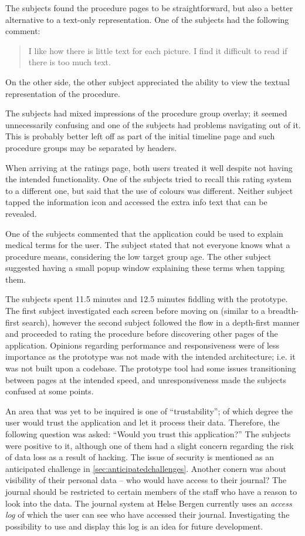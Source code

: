 The subjects found the procedure pages to be straightforward, but also a better alternative to a text-only representation. One of the subjects had the following comment:

\begin{quote}
    I like how there is little text for each picture. I find it difficult to read if there is too much text.
\end{quote}

On the other side, the other subject appreciated the ability to view the textual representation of the procedure.

The subjects had mixed impressions of the procedure group overlay; it seemed unnecessarily confusing and one of the subjects had problems navigating out of it. This is probably better left off as part of the initial timeline page and such procedure groups may be separated by headers.

When arriving at the ratings page, both users treated it well despite not having the intended functionality. One of the subjects tried to recall this rating system to a different one, but said that the use of colours was different. Neither subject tapped the information icon and accessed the extra info text that can be revealed.

One of the subjects commented that the application could be used to explain medical terms for the user. The subject stated that not everyone knows what a procedure means, considering the low target group age. The other subject suggested having a small popup window explaining these terms when tapping them.

The subjects spent 11.5 minutes and 12.5 minutes fiddling with the prototype. The first subject investigated each screen before moving on (similar to a breadth-first search), however the second subject followed the flow in a depth-first manner and proceeded to rating the procedure before discovering other pages of the application. Opinions regarding performance and responsiveness were of less importance as the prototype was not made with the intended architecture; i.e. it was not built upon a codebase. The prototype tool had some issues transitioning between pages at the intended speed, and unresponsiveness made the subjects confused at some points.

An area that was yet to be inquired is one of \enquote{trustability}; of which degree the user would trust the application and let it process their data. Therefore, the following question was asked: \enquote{Would you trust this application?} The subjects were positive to it, although one of them had a slight concern regarding the risk of data loss as a result of hacking. The issue of security is mentioned as an anticipated challenge in \autoref{sec:anticipatedchallenges}. Another conern was about visibility of their personal data -- who would have access to their journal? The journal should be restricted to certain members of the staff who have a reason to look into the data. The journal system at Helse Bergen currently uses an \emph{access log} of which the user can see who have accessed their journal. Investigating the possibility to use and display this log is an idea for future development.
